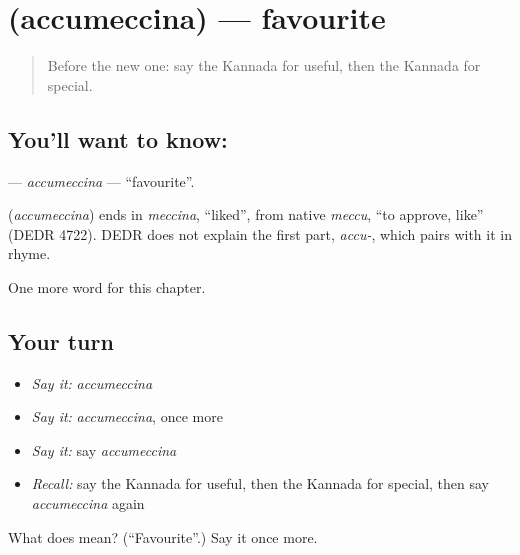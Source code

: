 \section[\texorpdfstring{\kn{ಅಚ್ಚುಮೆಚ್ಚಿನ} (accumeccina)}{ಅಚ್ಚುಮೆಚ್ಚಿನ (accumeccina)}]{ (accumeccina) — favourite}

\label{lesson:KA-C181-accumeccina}



\begin{quote}
Before the new one: say the Kannada for useful, then the Kannada for special.
\end{quote}

\subsection*{You'll want to know: }
\textbf{} — \emph{accumeccina} — \textquotedblleft{}favourite\textquotedblright{}.

\begin{cousinweb}
\textbf{} (\emph{accumeccina}) ends in \emph{meccina}, \textquotedblleft{}liked\textquotedblright{}, from native \emph{meccu}, \textquotedblleft{}to approve, like\textquotedblright{} (DEDR 4722). DEDR does not explain the first part, \emph{accu-}, which pairs with it in rhyme.
\end{cousinweb}

\begin{grammarlens}[title={What you've built}]
One more word for this chapter.
\end{grammarlens}

\subsection*{Your turn}
\begin{itemize}
\raggedright
  \item \emph{Say it:} \emph{accumeccina}
  \item \emph{Say it:} \emph{accumeccina}, once more
  \item \emph{Say it:} say \emph{accumeccina}
  \item \emph{Recall:} say the Kannada for useful, then the Kannada for special, then say \emph{accumeccina} again
\end{itemize}

\begin{tcolorbox}[breakable,colback=teal!4,colframe=teal!35!black,title={Before you move on}]
What does  mean? (\textquotedblleft{}Favourite\textquotedblright{}.) Say it once more.
\end{tcolorbox}
